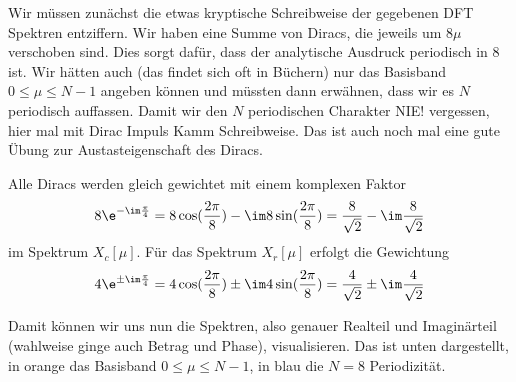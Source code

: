 \begin{ExCalc}
%
Wir müssen zunächst die etwas kryptische Schreibweise der gegebenen DFT
Spektren entziffern.
Wir haben eine Summe von Diracs, die jeweils um $8\mu$ verschoben sind. Dies
sorgt dafür, dass der analytische Ausdruck periodisch in 8 ist. Wir hätten auch
(das findet sich oft in Büchern) nur das Basisband $0\leq \mu \leq N-1$ angeben
können und müssten dann erwähnen, dass wir es $N$ periodisch auffassen.
%
Damit wir den $N$ periodischen Charakter NIE! vergessen, hier mal mit Dirac
Impuls Kamm Schreibweise. Das ist auch noch mal eine gute Übung zur
Austasteigenschaft des Diracs.

Alle Diracs werden gleich gewichtet mit einem komplexen Faktor
\begin{align}
8 \e^{-\im\frac{\pi}{4}}  = 8 \cos(\frac{2\pi}{8}) - \im 8 \sin(\frac{2\pi}{8})=
\frac{8}{\sqrt{2}} - \im \frac{8}{\sqrt{2}}
\end{align}
im Spektrum $X_c[\mu]$.
%
Für das Spektrum $X_r[\mu]$ erfolgt die Gewichtung
\begin{align}
4 \e^{\pm\im\frac{\pi}{4}}  = 4 \cos(\frac{2\pi}{8}) \pm \im 4 \sin(\frac{2\pi}{8})=
\frac{4}{\sqrt{2}} \pm \im \frac{4}{\sqrt{2}}
\end{align}

Damit können wir uns nun die Spektren, also genauer Realteil und Imaginärteil
(wahlweise ginge auch Betrag und Phase), visualisieren. Das ist unten dargestellt,
in orange das Basisband $0\leq \mu \leq N-1$, in blau die $N=8$ Periodizität.


\end{ExCalc}
